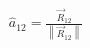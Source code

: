 \documentclass[preview]{standalone}
\begin{document}
\begin{align*}
\hat{a}_{12} = \frac{\vec{R}_{12}}{\left\|\vec{R}_{12}\right\|}
\end{align*}
\end{document}
